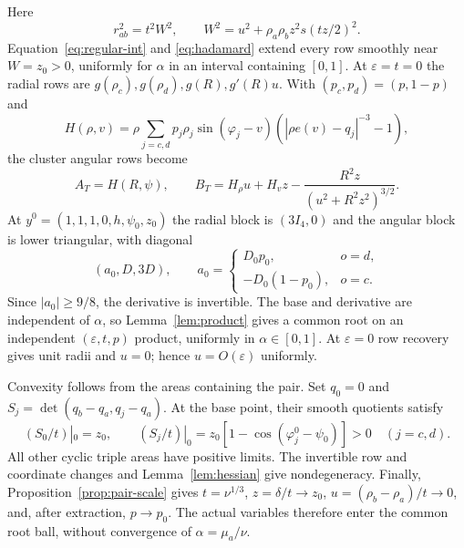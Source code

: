 \documentclass[11pt,a4paper]{article}
\numberwithin{equation}{section}
\theoremstyle{remark}
\newcommand{\eps}{\varepsilon}
\begin{document}
Here
\begin{equation}\label{eq:pair-W}
 r_{ab}^2=t^2W^2,\qquad W^2=u^2+\rho_a\rho_bz^2s(tz/2)^2.
\end{equation}
Equation~\eqref{eq:regular-int} and \eqref{eq:hadamard} extend every row smoothly near $W=z_0>0$, uniformly for $\alpha$ in an interval containing $[0,1]$. At $\eps=t=0$ the radial rows are $g(\rho_c),g(\rho_d),g(R),g'(R)u$. With $(p_c,p_d)=(p,1-p)$ and
\[
 H(\rho,v)=\rho\sum_{j=c,d}p_j\rho_j\sin(\varphi_j-v)
 (|\rho e(v)-q_j|^{-3}-1),
\]
the cluster angular rows become
\begin{equation}\label{eq:pair-boundary}
 A_T=H(R,\psi),\qquad
 B_T=H_\rho u+H_vz-\frac{R^2z}{(u^2+R^2z^2)^{3/2}}.
\end{equation}
At $y^0=(1,1,1,0,h,\psi_0,z_0)$ the radial block is $(3I_4,0)$ and the angular block is lower triangular, with diagonal
\begin{equation}\label{eq:pair-J}
 (a_0,D,3D),\qquad
 a_0=\begin{cases}D_0p_0,&o=d,\\-D_0(1-p_0),&o=c.\end{cases}
\end{equation}
Since $|a_0|\ge9/8$, the derivative is invertible. The base and derivative are independent of $\alpha$, so Lemma~\ref{lem:product} gives a common root on an independent $(\eps,t,p)$ product, uniformly in $\alpha\in[0,1]$. At $\eps=0$ row recovery gives unit radii and $u=0$; hence $u=O(\eps)$ uniformly.

Convexity follows from the areas containing the pair. Set $q_0=0$ and $S_j=\det(q_b-q_a,q_j-q_a)$. At the base point, their smooth quotients satisfy
\begin{equation}\label{eq:pair-areas}
 (S_0/t)|_0=z_0,\qquad
 (S_j/t)|_0=z_0[1-\cos(\varphi_j^0-\psi_0)]>0\quad(j=c,d).
\end{equation}
All other cyclic triple areas have positive limits. The invertible row and coordinate changes and Lemma~\ref{lem:hessian} give nondegeneracy. Finally, Proposition~\ref{prop:pair-scale} gives $t=\nu^{1/3}$, $z=\delta/t\to z_0$, $u=(\rho_b-\rho_a)/t\to0$, and, after extraction, $p\to p_0$. The actual variables therefore enter the common root ball, without convergence of $\alpha=\mu_a/\nu$.
\end{document}
